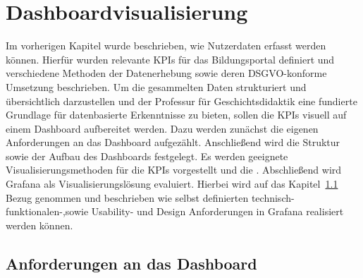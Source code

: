 \chapter{Dashboardvisualisierung} %
\label{ch:auswahl}
Im vorherigen Kapitel wurde beschrieben, wie Nutzerdaten erfasst werden können. Hierfür wurden relevante KPIs für das Bildungsportal definiert und verschiedene Methoden der Datenerhebung sowie deren DSGVO-konforme Umsetzung beschrieben. Um die gesammelten Daten strukturiert und übersichtlich darzustellen und der Professur für Geschichtsdidaktik eine fundierte Grundlage für datenbasierte Erkenntnisse zu bieten, sollen die KPIs visuell auf einem Dashboard aufbereitet werden. Dazu werden zunächst die eigenen Anforderungen an das Dashboard aufgezählt. Anschließend wird die Struktur sowie der Aufbau des Dashboards festgelegt. Es werden geeignete Visualisierungsmethoden für die KPIs vorgestellt und die . Abschließend wird Grafana als Visualisierungslösung evaluiert. Hierbei wird auf das Kapitel~\ref{sec:anforderungen} Bezug genommen und beschrieben wie selbst definierten technisch-funktionalen-,sowie Usability- und Design Anforderungen in Grafana realisiert werden können. 

\section{Anforderungen an das Dashboard}
\label{sec:anforderungen}
